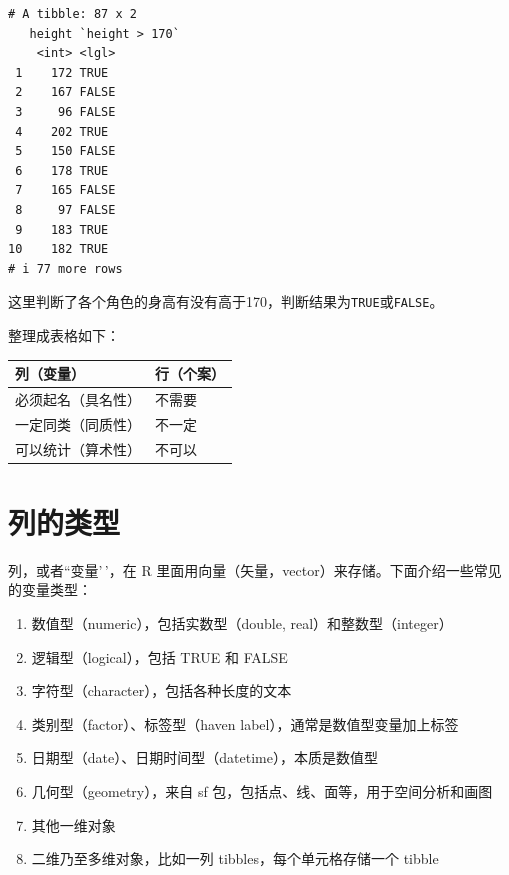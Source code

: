 \documentclass[
  letterpaper,
]{ctexbook}
\providecommand{\tightlist}{%
  \setlength{\itemsep}{0pt}\setlength{\parskip}{0pt}}\usepackage{longtable,booktabs,array}
\begin{document}
\begin{verbatim}
# A tibble: 87 x 2
   height `height > 170`
    <int> <lgl>         
 1    172 TRUE          
 2    167 FALSE         
 3     96 FALSE         
 4    202 TRUE          
 5    150 FALSE         
 6    178 TRUE          
 7    165 FALSE         
 8     97 FALSE         
 9    183 TRUE          
10    182 TRUE          
# i 77 more rows
\end{verbatim}

这里判断了各个角色的身高有没有高于170，判断结果为\texttt{TRUE}或\texttt{FALSE}。

整理成表格如下：

\begin{longtable}[]{@{}ll@{}}
\toprule\noalign{}
列（变量） & 行（个案） \\
\midrule\noalign{}
\endhead
\bottomrule\noalign{}
\endlastfoot
必须起名（具名性） & 不需要 \\
一定同类（同质性） & 不一定 \\
可以统计（算术性） & 不可以 \\
\end{longtable}

\hypertarget{ux5217ux7684ux7c7bux578b}{%
\section{列的类型}\label{ux5217ux7684ux7c7bux578b}}

列，或者``变量'\,'，在 R
里面用向量（矢量，vector）来存储。下面介绍一些常见的变量类型：

\begin{enumerate}
\def\labelenumi{\arabic{enumi}.}
\tightlist
\item
  数值型（numeric），包括实数型（double, real）和整数型（integer）
\item
  逻辑型（logical），包括 TRUE 和 FALSE
\item
  字符型（character），包括各种长度的文本
\item
  类别型（factor）、标签型（haven label），通常是数值型变量加上标签
\item
  日期型（date）、日期时间型（datetime），本质是数值型
\item
  几何型（geometry），来自 sf 包，包括点、线、面等，用于空间分析和画图
\item
  其他一维对象
\item
  二维乃至多维对象，比如一列 tibbles，每个单元格存储一个 tibble
\end{enumerate}
\end{document}
